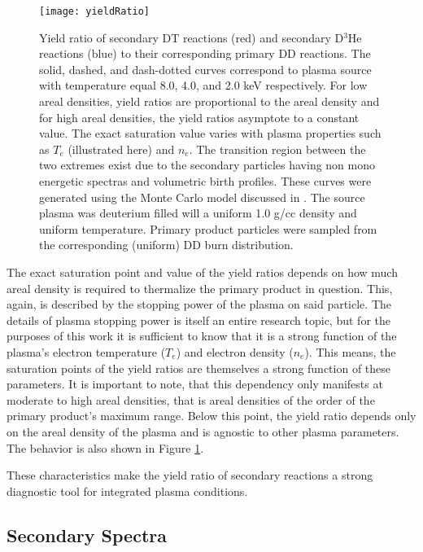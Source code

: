 	\begin{figure}[h!]
		\centering
		\texttt{[image: yieldRatio]}
		\caption[Secondary Product  Yield Ratios]{Yield ratio of secondary DT reactions (red) and secondary D$^3$He reactions (blue) to their corresponding primary DD reactions. The solid, dashed, and dash-dotted curves correspond to plasma source with temperature equal 8.0, 4.0, and 2.0 keV respectively. For low areal densities, yield ratios are proportional to the areal density and for high areal densities, the yield ratios asymptote to a constant value. The exact saturation value varies with plasma properties such as $T_e$ (illustrated here) and $n_e$. The transition region between the two extremes exist due to the secondary particles having non mono energetic spectras and volumetric birth profiles. These curves were generated using the Monte Carlo model discussed in . The source plasma was deuterium filled will a uniform 1.0 g/cc density and uniform temperature. Primary product particles were sampled from the corresponding (uniform) DD burn distribution.  }
		\label{yieldRatioCurves}
	\end{figure}

	

	The exact saturation point and value of the yield ratios depends on how much areal density is required to thermalize the primary product in question. This, again, is described by the stopping power of the plasma on said particle. The details of plasma stopping power is itself an entire research topic, but for the purposes of this work it is sufficient to know that it is a strong function of the plasma's electron temperature ($T_e$) and electron density ($n_e$). This means, the saturation points of the yield ratios are themselves a strong function of these parameters. It is important to note, that this dependency only manifests at moderate to high areal densities, that is areal densities of the order of the primary product's maximum range. Below this point, the yield ratio depends only on the areal density of the plasma and is agnostic to other plasma parameters. The behavior is also shown in Figure \ref{yieldRatioCurves}.
	
	These characteristics make the yield ratio of secondary reactions a strong diagnostic tool for integrated plasma conditions. 
	
	
\subsection{Secondary Spectra}

